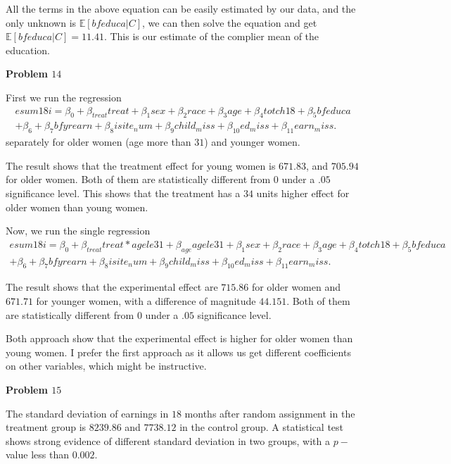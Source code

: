 \documentclass[11pt,a4paper]{amsart}
\theoremstyle{plain}
\theoremstyle{definition}
\begin{document}
 All the terms in the above equation can be easily estimated by our data, and the only unknown is $\mathbb{E}\left[bfeduca | C\right]$, we can then solve the equation and get $\mathbb{E}\left[bfeduca | C\right] = 11.41$. This is our estimate of the complier mean of the education.
  
 \vspace{10pt}
 
 \textbf{Problem $14$}\hfil
 
 First we run the regression 
 \[	\begin{aligned}
 	esum18i = \beta_{0}  + \beta_{treat} treat + \beta_{1}sex + \beta_{2}race + \beta_{3}age + \beta_{4} totch18 + \beta_{5}bfeduca \\
 	+ \beta_{6} + \beta_{7} bfyrearn + \beta_{8}i site_num + \beta_{9}child_miss + \beta_{10}ed_miss + \beta_{11} earn_miss.
 \end{aligned}	\]
separately for older women (age more than $31$) and younger women. 

The result shows that the treatment effect for young women is $671.83$, and $705.94$ for older women. Both of them are statistically different from $0$ under a $.05$ significance level. This shows that the treatment has a $34$ units higher effect for older women than young women.

Now, we run the single regression
 \[	\begin{aligned}
	esum18i = \beta_{0}  +  \beta_{treat} treat * agele31 + \beta_{age}agele31 +\beta_{1}sex + \beta_{2}race + \beta_{3}age + \beta_{4} totch18 + \beta_{5}bfeduca \\
	+ \beta_{6} + \beta_{7} bfyrearn + \beta_{8}i site_num + \beta_{9}child_miss + \beta_{10}ed_miss + \beta_{11} earn_miss.
\end{aligned}	\]

The result shows that the experimental effect are $715.86$  for older women and $671.71$ for younger women, with a difference of magnitude $44.151$. Both of them are statistically different from $0$ under a $.05$ significance level.

Both approach show that the experimental effect is higher for older women than young women. I prefer the first approach as it allows us get different coefficients on other variables, which might be instructive.

\vspace{10pt}

\textbf{Problem $15$}\hfil

The standard deviation of earnings in $18$ months after random assignment in the treatment group is $8239.86$ and $7738.12$ in the control group. A statistical test shows strong evidence of different standard deviation in two groups, with a $p-$value less than $0.002$. 
\end{document}
